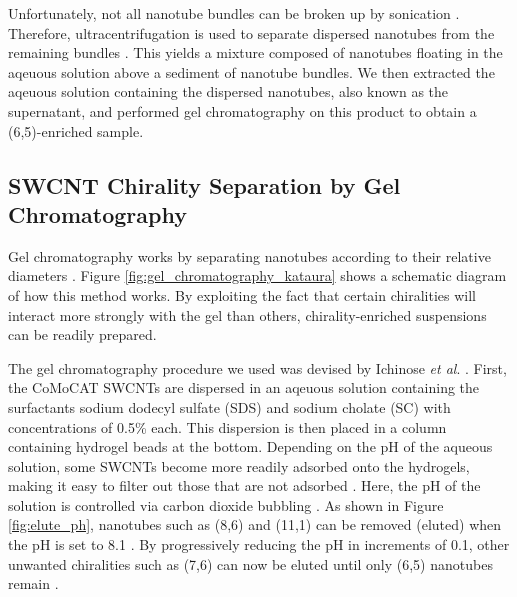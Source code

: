 Unfortunately, not all nanotube bundles can be broken up by sonication \cite{o2002band}. Therefore, ultracentrifugation is used to separate dispersed nanotubes from the remaining bundles \cite{o2002band}. This yields a mixture composed of nanotubes floating in the aqeuous solution above a sediment of nanotube bundles. We then extracted the aqeuous solution containing the dispersed nanotubes, also known as the supernatant, and performed gel chromatography on this product to obtain a (6,5)-enriched sample.

\subsection{SWCNT Chirality Separation by Gel Chromatography}

Gel chromatography works by separating nanotubes according to their relative diameters \cite{liu2011large}. Figure \ref{fig:gel_chromatography_kataura} shows a schematic diagram of how this method works. By exploiting the fact that certain chiralities will interact more strongly with the gel than others, chirality-enriched suspensions can be readily prepared.

The gel chromatography procedure we used was devised by Ichinose \textit{et al}. \cite{ichinose2017extraction}. First, the CoMoCAT SWCNTs are dispersed in an aqeuous solution containing the surfactants sodium dodecyl sulfate (SDS) and sodium cholate (SC) with concentrations of 0.5\% each. This dispersion is then placed in a column containing hydrogel beads at the bottom. Depending on the pH of the aqueous solution, some SWCNTs become more readily adsorbed onto the hydrogels, making it easy to filter out those that are not adsorbed \cite{liu2011large}. Here, the pH of the solution is controlled via carbon dioxide bubbling \cite{ichinose2017extraction}. As shown in Figure \ref{fig:elute_ph}, nanotubes such as (8,6) and (11,1) can be removed (eluted) when the pH is set to 8.1 \cite{ichinose2017extraction}. By progressively reducing the pH in increments of 0.1, other unwanted chiralities such as (7,6) can now be eluted until only (6,5) nanotubes remain \cite{ichinose2017extraction}.

